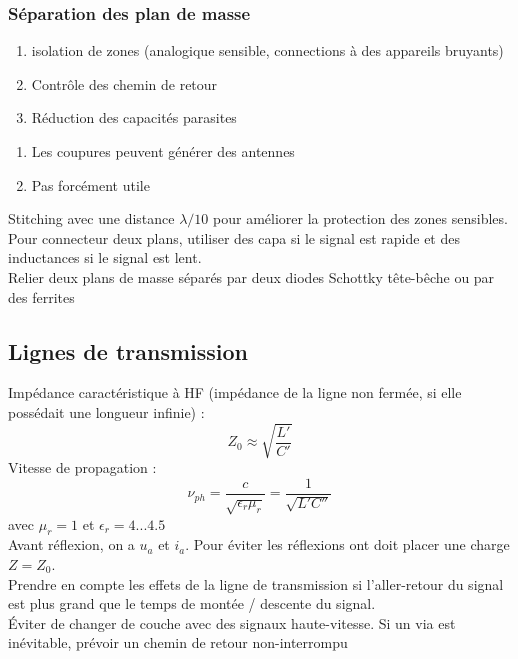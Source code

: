 \documentclass[resume]{subfiles}
\begin{document}
\begin{multicols}{3}
\subsubsection{Séparation des plan de masse}
\begin{multicols}{2}
\begin{enumerate}[label={+}]
\item isolation de zones (analogique sensible, connections à des appareils bruyants)
\item Contrôle des chemin de retour 
\item Réduction des capacités parasites
\end{enumerate}
\begin{enumerate}[label={-}]
\item Les coupures peuvent générer des antennes
\item Pas forcément utile
\end{enumerate}
\end{multicols}
Stitching avec une distance $\lambda/10$ pour améliorer la protection des zones sensibles.\\
Pour connecteur deux plans, utiliser des capa si le signal est rapide et des inductances si le signal est lent.\\
Relier deux plans de masse séparés par deux diodes Schottky tête-bêche ou par des ferrites
\subsection{Lignes de transmission}
Impédance caractéristique à HF (impédance de la ligne non fermée, si elle possédait une longueur infinie) :
$$Z_0\approx \sqrt{\frac{L'}{C'}} $$
Vitesse de propagation :
$$\nu_{ph} = \frac{c}{\sqrt{\epsilon_r \mu_r}} = \frac{1}{\sqrt{L' C''}}$$ avec $\mu_r = 1$ et $\epsilon_r =4...4.5$\\
Avant réflexion, on a $u_a$ et $i_a$. Pour éviter les réflexions ont doit placer une charge $Z=Z_0$.\\
Prendre en compte les effets de la ligne de transmission si l'aller-retour du signal est plus grand que le temps de montée / descente du signal.\\
Éviter de changer de couche avec des signaux haute-vitesse. Si un via est inévitable, prévoir un chemin de retour non-interrompu

\end{multicols}
\end{document}
